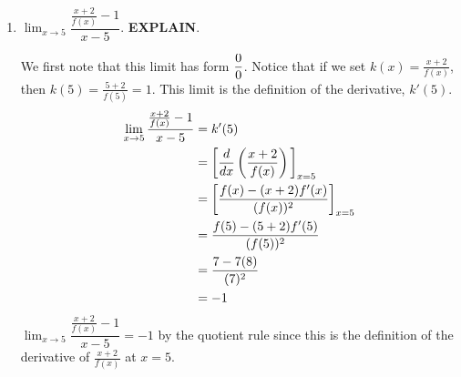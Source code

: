 \documentclass{ximera}
\begin{document}
\begin{problem}
\begin{enumerate}
	\item $\displaystyle \lim_{x\to 5} \dfrac{\frac{x+2}{f(x)} - 1 }{x-5}$. \textbf{EXPLAIN}.
\begin{explanation}
		
		We first note that this limit has form $\dfrac{0}{0}$.
		Notice that if we set $k(x) = \frac{x+2}{f(x)}$, then $k(5) = \frac{5+2}{f(5)} = 1$. This limit is the definition of the derivative, $k'(5)$.
		\begin{align*}
			\lim_{x\to 5} \dfrac{\frac{x+2}{f(x)} - 1 }{x-5} &= k'(5) \\
				&= \bigg[ \dfrac{d}{dx} \left( \frac{x+2}{f(x)} \right) \bigg]_{x=5}\\
				&= \bigg[  \dfrac{f(x) - (x+2)f'(x)}{(f(x))^2}  \bigg]_{x=5}\\
				&= \dfrac{f(5) - (5+2)f'(5)}{(f(5))^2}\\
				&= \dfrac{7 - 7(8)}{(7)^2}\\
				&= -1
		\end{align*}
	$\displaystyle \lim_{x\to 5} \dfrac{\frac{x+2}{f(x)} - 1 }{x-5} = -1$ by the quotient rule since this is the definition of the derivative of $\frac{x+2}{f(x)}$ at $x=5$.		
		\end{explanation}		
	\end{enumerate}
		
\end{problem}
\end{document}
